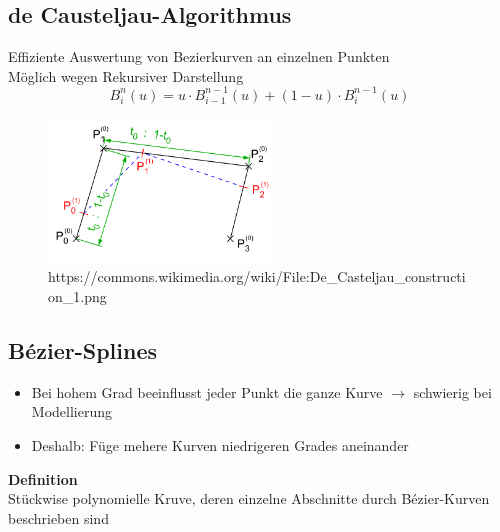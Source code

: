 \documentclass[10pt,a4paper]{article}
\begin{document}
        \subsection{de Causteljau-Algorithmus}
        Effiziente Auswertung von Bezierkurven an einzelnen Punkten\\
        Möglich wegen Rekursiver Darstellung
        \[B_i^n(u) = u \cdot B_{i-1}^{n-1} (u) + (1 - u) \cdot B_i^{n-1}(u)\]
        \begin{figure}[h]
          \includegraphics[width=6cm]{images/De_Casteljau_construction_1}
          \caption{https://commons.wikimedia.org/wiki/File:De\_Casteljau\_construction\_1.png}
        \end{figure}

        \subsection{Bézier-Splines}
        \begin{itemize}
        \item Bei hohem Grad beeinflusst jeder Punkt die ganze Kurve \(\rightarrow\) schwierig bei Modellierung
        \item Deshalb: Füge mehere Kurven niedrigeren Grades aneinander
        \end{itemize}
        \textbf{Definition}\\
        Stückwise polynomielle Kruve, deren einzelne Abschnitte durch Bézier-Kurven beschrieben sind
        
\end{document}
